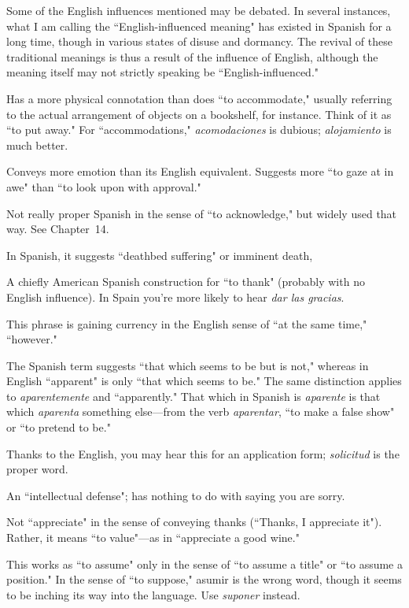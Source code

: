 Some of the English influences mentioned may be debated. In
several instances, what I am calling the ``English-influenced meaning"
has existed in Spanish for a long time, though in various states of disuse and dormancy. The revival of these traditional meanings is thus a
result of the influence of English, although the meaning itself may not
strictly speaking be ``English-influenced."

\bsk

 Has a more physical connotation than does ``to
accommodate," usually referring to the actual arrangement of objects on a bookshelf, for instance. Think of it as ``to put away." For ``accommodations," \emph{acomodaciones} is dubious; \emph{alojamiento} is much better.

 Conveys more emotion than its English equivalent.
Suggests more ``to gaze at in awe" than ``to look upon with approval."

 Not really proper Spanish in the sense of ``to acknowledge," but widely used that way. See Chapter~14.

 In Spanish, it suggests ``deathbed suffering" or imminent death,

 A chiefly American Spanish construction for
``to thank" (probably with no English influence). In Spain you're more
likely to hear \emph{dar las gracias}.

 This phrase is gaining currency in the English sense of ``at the same time," ``however."

 The Spanish term suggests ``that which seems
to be but is not," whereas in English ``apparent" is only ``that which
seems to be." The same distinction applies to \emph{aparentemente} and ``apparently." That which in Spanish is \emph{aparente} is that which \emph{aparenta}
something else---from the verb \emph{aparentar}, ``to make a false show" or
``to pretend to be."

 Thanks to the English, you may hear this for an
application form; \emph{solicitud} is the proper word.

 An ``intellectual defense"; has nothing to do with
saying you are sorry.

 Not ``appreciate" in the sense of conveying
thanks (``Thanks, I appreciate it"). Rather, it means ``to value"---as
in ``appreciate a good wine."

 This works as ``to assume" only in the sense of ``to
assume a title" or ``to assume a position." In the sense of ``to suppose,"
asumir is the wrong word, though it seems to be inching its way into
the language. Use \emph{suponer} instead.

